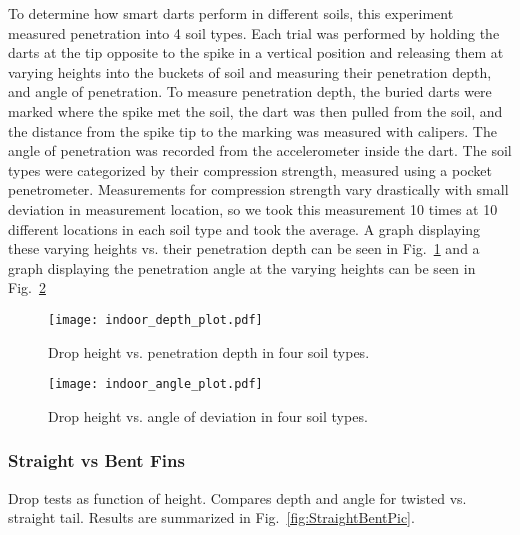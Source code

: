 To determine how smart darts perform in different soils, this experiment measured penetration into 4 soil types.  Each trial was performed by holding the darts at the tip opposite to the spike in a vertical position and releasing them at varying heights into the buckets of soil and measuring their penetration depth, and angle of penetration. To measure penetration depth, the buried darts were marked where the spike met the soil, the dart was then pulled from the soil, and the distance from the spike tip to the marking was measured with calipers. The angle of penetration was recorded from the accelerometer inside the dart. The soil types were categorized by their compression strength, measured using a pocket penetrometer. Measurements for compression strength vary drastically with small deviation in measurement location, so we took this measurement 10 times at 10 different locations in each soil type and took the average. A graph displaying these varying heights vs. their penetration depth can be seen in Fig.~\ref{fig:DepthPlotIndoors} and a graph displaying the penetration angle at the varying heights can be seen in Fig.\ \ref{fig:AnglePlotIndoors}

\begin{figure} \centering
{\texttt{[image: indoor\_depth\_plot.pdf]}}
\caption{Drop height vs. penetration depth in four soil types.} 
\label{fig:DepthPlotIndoors}
\end{figure}

\begin{figure} \centering
{\texttt{[image: indoor\_angle\_plot.pdf]}}
\caption{Drop height vs. angle of deviation in four soil types.} 
\label{fig:AnglePlotIndoors}
\vspace{-1em}
\end{figure}

\subsubsection{Straight vs Bent Fins}

Drop tests as function of height. Compares depth and angle for twisted vs. straight tail.
Results are summarized in Fig.~\ref{fig:StraightBentPic}.

